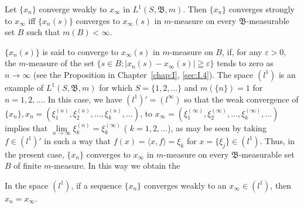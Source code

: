\begin{theorem}\label{thm:V.1.Theorem.5} Let $\{x_{n}\}$ converge weakly to $x_{\infty}$ in $L^{1}(S, \mathfrak{B}, m)$. Then $\{x_{n}\}$ converges strongly to $x_{\infty}$ iff $\{x_{n}(s)\}$ converges to $x_{\infty}(s)$ in $m$-measure on every $\mathfrak{B}$-measurable set $B$ such that $m(B) < \infty$. 
\end{theorem}

\begin{remarku} $\{x_{n}(s)\}$ is said to converge to $x_{\infty}(s)$ in $m$-measure on $B$, if, for any $\varepsilon > 0$, the $m$-measure of the set $\{s \in B; |x_{n}(s) - x_{\infty}(s)| \geqq \varepsilon\}$ tends to zero as $n \to \infty$ (see the Proposition in Chapter~\ref{chap:I}, \ref{sec:I.4}). The space $(l^{1})$ is an example of $L^{1}(S, \mathfrak{B}, m)$ for which $S = \{1, 2, \ldots\}$ and $m(\{n\}) = 1$ for $n = 1, 2, \ldots$. In this case, we have $(l^{1})' = (l^{\infty})$ so that the weak convergence of $\{x_{n}\}, x_{n} = (\xi_{1}^{(n)}, \xi_{2}^{(n)}, \ldots, \xi_{k}^{(n)}, \ldots)$, to $x_{\infty} = (\xi_{1}^{(\infty)}, \xi_{2}^{(\infty)}, \ldots, \xi_{k}^{(\infty)}, \ldots)$ implies that $\lim\limits_{n \to \infty} \xi_{k}^{(n)} = \xi_{k}^{(\infty)}$ ( $k = 1, 2, \ldots$), as may be seen by taking $f \in (l^{1})'$ in such a way that $f(x) = \langle x, f \rangle = \xi_{k}$ for $x = \{\xi_{j}\} \in (l^{1})$. Thus, in the present case, $\{x_{n}\}$ converges to $x_{\infty}$ in $m$-measure on every $\mathfrak{B}$-measurable set $B$ of finite $m$-measure. In this way we obtain the 
\end{remarku}

\begin{corollaryn} In the space $(l^1)$, if a sequence $\{x_n\}$ converges weakly to an $x_{\infty} \in (l^1)$, then \slim $x_n = x_{\infty}$.
\end{corollaryn}

